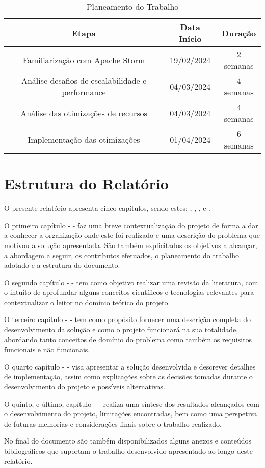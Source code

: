 \begin{table}[H]
  \begin{center}
    \caption{Planeamento do Trabalho}
    \vspace{5mm}
    \label{tab:plan}
    \begin{tabular}{|c|c|c|}
      \hline
      \textbf{Etapa} & \textbf{Data Início} & \textbf{Duração} \\ \hline
      Familiarização com Apache Storm  & 19/02/2024 & 2 semanas \\ \hline
      Análise desafios de escalabilidade e performance & 04/03/2024 & 4 semanas \\ \hline
      Análise das otimizações de recursos & 04/03/2024 & 4 semanas \\ \hline
      Implementação das otimizações & 01/04/2024 & 6 semanas \\ \hline
    \end{tabular}
  \end{center}
\end{table}

\section{Estrutura do Relatório}

O presente relatório apresenta cinco capítulos, sendo estes: ,
, ,  e
.

O primeiro capítulo -  - faz uma breve contextualização do projeto de
forma a dar a conhecer a organização onde este foi realizado e uma descrição do problema que motivou
a solução apresentada. São também explicitados os objetivos a alcançar, a abordagem a seguir, os
contributos efetuados, o planeamento do trabalho adotado e a estrutura do documento. 

O segundo capítulo -  - tem como objetivo realizar uma revisão da
literatura, com o intuito de aprofundar alguns conceitos científicos e tecnologias relevantes 
para contextualizar o leitor no domínio teórico do projeto.  

O terceiro capítulo -  - tem como propósito fornecer uma descrição completa 
do desenvolvimento da solução e como o projeto funcionará na sua totalidade, abordando tanto conceitos
de domínio do problema como também os requisitos funcionais e não funcionais.

O quarto capítulo -  - visa apresentar a solução desenvolvida e 
descrever detalhes de implementação, assim como explicações sobre as decisões tomadas durante o
desenvolvimento do projeto e possíveis alternativas.

O quinto, e último, capítulo -  - realiza uma síntese dos resultados 
alcançados com o desenvolvimento do projeto, limitações encontradas, bem como uma perspetiva de 
futuras melhorias e considerações finais sobre o trabalho realizado.

No final do documento são também disponibilizados alguns anexos e conteúdos bibliográficos que 
suportam o trabalho desenvolvido apresentado ao longo deste relatório.
